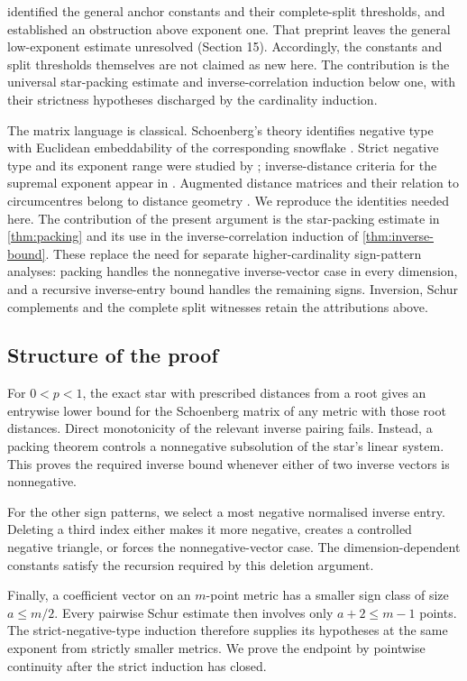 \documentclass[11pt,a4paper]{article}
\theoremstyle{definition}
\theoremstyle{remark}
\numberwithin{equation}{section}
\begin{document}
\citet[Version 3, Sections 11--12]{ksl} identified the general anchor constants and their complete-split thresholds, and established an obstruction above exponent one. That preprint leaves the general low-exponent estimate unresolved (Section 15). Accordingly, the constants and split thresholds themselves are not claimed as new here. The contribution is the universal star-packing estimate and inverse-correlation induction below one, with their strictness hypotheses discharged by the cardinality induction.

The matrix language is classical. Schoenberg's theory identifies negative type with Euclidean embeddability of the corresponding snowflake \citep{schoenberg}. Strict negative type and its exponent range were studied by \citet{liweston}; inverse-distance criteria for the supremal exponent appear in \citet{sanchez}. Augmented distance matrices and their relation to circumcentres belong to distance geometry \citep{fiedler}. We reproduce the identities needed here. The contribution of the present argument is the star-packing estimate in \cref{thm:packing} and its use in the inverse-correlation induction of \cref{thm:inverse-bound}. These replace the need for separate higher-cardinality sign-pattern analyses: packing handles the nonnegative inverse-vector case in every dimension, and a recursive inverse-entry bound handles the remaining signs. Inversion, Schur complements and the complete split witnesses retain the attributions above.

\subsection{Structure of the proof}
For $0<p<1$, the exact star with prescribed distances from a root gives an entrywise lower bound for the Schoenberg matrix of any metric with those root distances. Direct monotonicity of the relevant inverse pairing fails. Instead, a packing theorem controls a nonnegative subsolution of the star's linear system. This proves the required inverse bound whenever either of two inverse vectors is nonnegative.

For the other sign patterns, we select a most negative normalised inverse entry. Deleting a third index either makes it more negative, creates a controlled negative triangle, or forces the nonnegative-vector case. The dimension-dependent constants satisfy the recursion required by this deletion argument.

Finally, a coefficient vector on an $m$-point metric has a smaller sign class of size $a\le m/2$. Every pairwise Schur estimate then involves only $a+2\le m-1$ points. The strict-negative-type induction therefore supplies its hypotheses at the same exponent from strictly smaller metrics. We prove the endpoint by pointwise continuity after the strict induction has closed.
\end{document}
